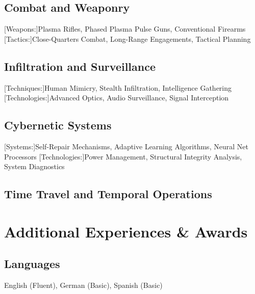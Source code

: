 \documentclass{concise-cv}
\begin{document}
\subsection*{Combat and Weaponry}
\begin{skillEnum}
    \skills{\expert}[Weapons:]{Plasma Rifles, Phased Plasma Pulse Guns, Conventional Firearms}
    \skills{\expert}[Tactics:]{Close-Quarters Combat, Long-Range Engagements, Tactical Planning}
\end{skillEnum}

\subsection*{Infiltration and Surveillance}
\begin{skillEnum}
    \skills{\expert}[Techniques:]{Human Mimicry, Stealth Infiltration, Intelligence Gathering}
    \skills{\intermediate}[Technologies:]{Advanced Optics, Audio Surveillance, Signal Interception}
\end{skillEnum}

\subsection*{Cybernetic Systems}
\begin{skillEnum}
    \skills{\expert}[Systems:]{Self-Repair Mechanisms, Adaptive Learning Algorithms, Neural Net Processors}
    \skills{\intermediate}[Technologies:]{Power Management, Structural Integrity Analysis, System Diagnostics}
\end{skillEnum}

\subsection*{Time Travel and Temporal Operations}
\begin{skillEnum}
\end{skillEnum}

\section{Additional Experiences \& Awards}

\subsection*{Languages}
\begin{cvEnum}
    \item English (Fluent), German (Basic), Spanish (Basic)
\end{cvEnum}
\end{document}
